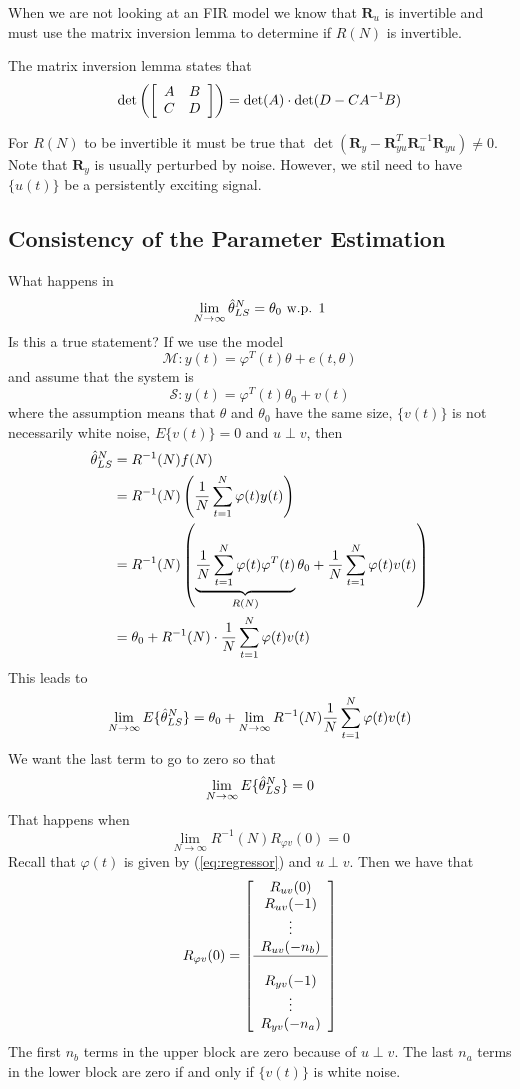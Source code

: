 When we are not looking at an FIR model we know that $\mathbf{R}_u$ is invertible and must use the matrix inversion lemma to determine if $R(N)$ is invertible.
\begin{definition}
The matrix inversion lemma states that
$$\det\left(\left[\begin{array}{c c}A&B\\C&D\end{array}\right]\right) = \det(A) \cdot \det(D-CA^{-1}B)$$
\end{definition}
For $R(N)$ to be invertible it must be true that $\det(\mathbf{R}_y-\mathbf{R}_{yu}^T\mathbf{R}_u^{-1}\mathbf{R}_{yu})\neq 0$. Note that $\mathbf{R}_y$ is usually perturbed by noise. However, we stil need to have $\{u(t)\}$ be a persistently exciting signal.

\subsection{Consistency of the Parameter Estimation}
\label{sec:peconsistency}
What happens in
$$\lim_{N\to\infty} \hat{\theta}_{LS}^N  = \theta_0 \text{ w.p. } 1$$
Is this a true statement? If we use the model
$$\mathcal{M}: y(t) = \varphi^T(t)\theta + e(t,\theta)$$
and assume that the system is
$$\mathcal{S}: y(t) = \varphi^T(t)\theta_0 + v(t)$$
where the assumption means that $\theta$ and $\theta_0$ have the same size, $\{v(t)\}$ is not necessarily white noise, $E\{v(t)\} = 0$ and $u\perp v$, then
\begin{align}
\label{eq:thn}
\hat{\theta}_{LS}^N &= R^{-1}(N)f(N) \nonumber \\
&= R^{-1}(N)\left(\frac{1}{N}\sum_{t=1}^N\varphi(t)y(t)\right) \nonumber \\
&= R^{-1}(N)\left( \underbrace{\frac{1}{N}\sum_{t=1}^N\varphi(t)\varphi^T(t)}_{R(N)}\theta_0+\frac{1}{N}\sum_{t=1}^N\varphi(t)v(t)\right) \nonumber\\
&= \theta_0 + R^{-1}(N)\cdot \frac{1}{N}\sum_{t=1}^N\varphi(t)v(t)
\end{align}
This leads to
$$\lim_{N\to\infty} E\{\hat{\theta}_{LS}^N\} = \theta_0 + \lim_{N\to\infty}R^{-1}(N)\frac{1}{N}\sum_{t=1}^N\varphi(t)v(t)$$
We want the last term to go to zero so that
$$\lim_{N\to\infty} E\{\hat{\theta}_{LS}^N\} = 0$$
That happens when
$$\lim_{N\to\infty} R^{-1}(N)R_{\varphi v}(0) = 0$$
Recall that $\varphi(t)$ is given by (\ref{eq:regressor}) and $u\perp v$. Then we have that
$$R_{\varphi v}(0) = \left[\begin{array}{c} R_{uv}(0) \\ R_{uv}(-1) \\ \vdots \\ R_{uv}(-n_b) \\ \hline \\ R_{yv}(-1) \\ \vdots \\ R_{yv}(-n_a) \end{array}\right]$$
The first $n_b$ terms in the upper block are zero because of $u\perp v$. The last $n_a$ terms in the lower block are zero if and only if $\{v(t)\}$ is white noise.

